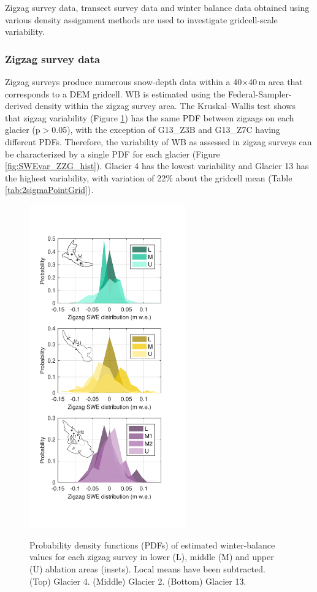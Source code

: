 \documentclass{sfuthesis}
\begin{document}
Zigzag survey data, transect survey data and winter balance data obtained using various density assignment methods are used to investigate gridcell-scale variability. 

\subsubsection{Zigzag survey data}
Zigzag surveys produce numerous snow-depth data within a 40$\times$40\,m area that corresponds to a DEM gridcell. WB is estimated using the Federal-Sampler-derived density within the zigzag survey area. The Kruskal--Wallis test shows that zigzag variability (Figure \ref{fig:SWEvar_ZZ_hist}) has the same PDF between zigzags on each glacier (p$>$0.05), with the exception of G13\_Z3B and G13\_Z7C having different PDFs. Therefore, the variability of WB as assessed in zigzag surveys can be characterized by a single PDF for each glacier (Figure \ref{fig:SWEvar_ZZG_hist}). Glacier 4 has the lowest variability and Glacier 13 has the highest variability, with variation of 22\% about the gridcell mean (Table  \ref{tab:2sigmaPointGrid}). 

\begin{figure}[H]
	\centering
	\includegraphics[width =0.6\textwidth]{ZigzagHistogram.pdf}\\
	\caption[Probability density functions (PDFs) of estimated winter-balance values for each zigzag survey in lower (L), middle (M) and upper (U) ablation areas]{Probability density functions (PDFs) of estimated winter-balance values for each zigzag survey in lower (L), middle (M) and upper (U) ablation areas (insets). Local means have been subtracted. (Top) Glacier 4. (Middle) Glacier 2. (Bottom) Glacier 13.}
	\label{fig:SWEvar_ZZ_hist}
\end{figure}
\end{document}
